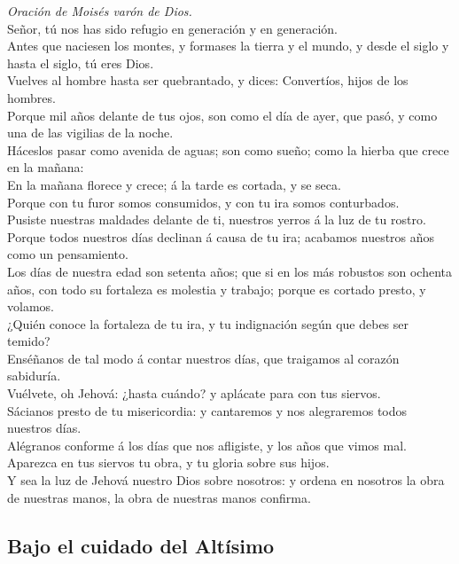  \emph{Oración de Moisés varón de Dios.}\\
Señor, tú nos has sido refugio en generación y en generación.\\
 Antes que naciesen los montes, y formases la tierra y el
mundo, y desde el siglo y hasta el siglo, tú eres Dios.\\
 Vuelves al hombre hasta ser quebrantado, y dices:
Convertíos, hijos de los hombres.\\
 Porque mil años delante de tus ojos, son como el día de
ayer, que pasó, y como una de las vigilias de la noche.\\
 Háceslos pasar como avenida de aguas; son como sueño; como
la hierba que crece en la mañana:\\
 En la mañana florece y crece; á la tarde es cortada, y se
seca.\\
 Porque con tu furor somos consumidos, y con tu ira somos
conturbados.\\
 Pusiste nuestras maldades delante de ti, nuestros yerros á
la luz de tu rostro.\\
 Porque todos nuestros días declinan á causa de tu ira;
acabamos nuestros años como un pensamiento.\\
 Los días de nuestra edad son setenta años; que si en los
más robustos son ochenta años, con todo su fortaleza es molestia y
trabajo; porque es cortado presto, y volamos.\\
 ¿Quién conoce la fortaleza de tu ira, y tu indignación
según que debes ser temido?\\
 Enséñanos de tal modo á contar nuestros días, que
traigamos al corazón sabiduría.\\
 Vuélvete, oh Jehová: ¿hasta cuándo? y aplácate para con
tus siervos.\\
 Sácianos presto de tu misericordia: y cantaremos y nos
alegraremos todos nuestros días.\\
 Alégranos conforme á los días que nos afligiste, y los
años que vimos mal.\\
 Aparezca en tus siervos tu obra, y tu gloria sobre sus
hijos.\\
 Y sea la luz de Jehová nuestro Dios sobre nosotros: y
ordena en nosotros la obra de nuestras manos, la obra de nuestras manos
confirma.

\hypertarget{bajo-el-cuidado-del-altuxedsimo}{%
\subsection{Bajo el cuidado del
Altísimo}\label{bajo-el-cuidado-del-altuxedsimo}}

